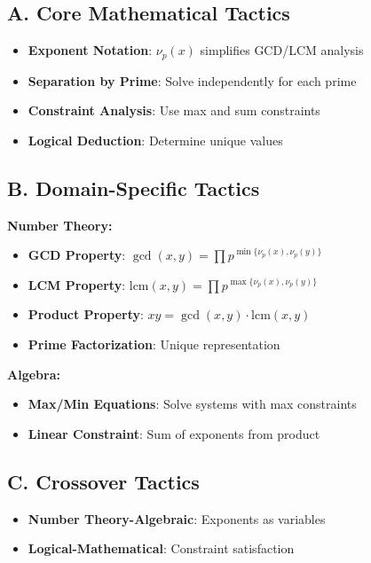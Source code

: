 \documentclass[12pt]{article}
\begin{document}
\begin{tacticalbox}
\subsection*{A. Core Mathematical Tactics}
\begin{itemize}[leftmargin=*]
    \item \textbf{Exponent Notation}: $\nu_p(x)$ simplifies GCD/LCM analysis
    \item \textbf{Separation by Prime}: Solve independently for each prime
    \item \textbf{Constraint Analysis}: Use max and sum constraints
    \item \textbf{Logical Deduction}: Determine unique values
\end{itemize}

\subsection*{B. Domain-Specific Tactics}

\textbf{Number Theory:}
\begin{itemize}[leftmargin=*]
    \item \textbf{GCD Property}: $\gcd(x,y) = \prod p^{\min\{\nu_p(x), \nu_p(y)\}}$
    \item \textbf{LCM Property}: $\text{lcm}(x,y) = \prod p^{\max\{\nu_p(x), \nu_p(y)\}}$
    \item \textbf{Product Property}: $xy = \gcd(x,y) \cdot \text{lcm}(x,y)$
    \item \textbf{Prime Factorization}: Unique representation
\end{itemize}

\textbf{Algebra:}
\begin{itemize}[leftmargin=*]
    \item \textbf{Max/Min Equations}: Solve systems with max constraints
    \item \textbf{Linear Constraint}: Sum of exponents from product
\end{itemize}

\subsection*{C. Crossover Tactics}
\begin{itemize}[leftmargin=*]
    \item \textbf{Number Theory-Algebraic}: Exponents as variables
    \item \textbf{Logical-Mathematical}: Constraint satisfaction
\end{itemize}
\end{tacticalbox}
\end{document}
